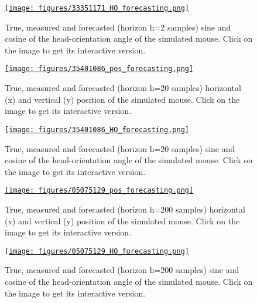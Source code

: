 \documentclass[12pt]{article}
\begin{document}
\begin{figure}
    \centering
    \href{https://www.gatsby.ucl.ac.uk/~rapela/aman/reports/ekfForKinematicsAndHeadOrientation/figures/33351171_HO_forecasting.html}{\texttt{[image: figures/33351171\_HO\_forecasting.png]}}
    \caption{True, measured and forecasted (horizon h=2 samples) sine and
    cosine of the head-orientation angle
    of the simulated mouse. Click on the image to get its
    interactive version.}
    \label{fig:sim_h2_HO}
\end{figure}

\begin{figure}
    \centering
    \href{https://www.gatsby.ucl.ac.uk/~rapela/aman/reports/ekfForKinematicsAndHeadOrientation/figures/35401086_pos_forecasting.html}{\texttt{[image: figures/35401086\_pos\_forecasting.png]}}
    \caption{True, measured and forecasted (horizon h=20 samples) horizontal (x) and vertical (y)
    position of the simulated mouse. Click on the image to get its
    interactive version.}
    \label{fig:sim_h20_pos}
\end{figure}

\begin{figure}
    \centering
    \href{https://www.gatsby.ucl.ac.uk/~rapela/aman/reports/ekfForKinematicsAndHeadOrientation/figures/35401086_HO_forecasting.html}{\texttt{[image: figures/35401086\_HO\_forecasting.png]}}
    \caption{True, measured and forecasted (horizon h=20 samples) sine and
    cosine of the head-orientation angle
    of the simulated mouse. Click on the image to get its
    interactive version.}
    \label{fig:sim_h20_HO}
\end{figure}

\begin{figure}
    \centering
    \href{https://www.gatsby.ucl.ac.uk/~rapela/aman/reports/ekfForKinematicsAndHeadOrientation/figures/05075129_pos_forecasting.html}{\texttt{[image: figures/05075129\_pos\_forecasting.png]}}
    \caption{True, measured and forecasted (horizon h=200 samples) horizontal (x) and vertical (y)
    position of the simulated mouse. Click on the image to get its
    interactive version.}
    \label{fig:sim_h200_pos}
\end{figure}

\begin{figure}
    \centering
    \href{https://www.gatsby.ucl.ac.uk/~rapela/aman/reports/ekfForKinematicsAndHeadOrientation/figures/05075129_HO_forecasting.html}{\texttt{[image: figures/05075129\_HO\_forecasting.png]}}
    \caption{True, measured and forecasted (horizon h=200 samples) sine and
    cosine of the head-orientation angle
    of the simulated mouse. Click on the image to get its
    interactive version.}
    \label{fig:sim_h200_HO}
\end{figure}
\end{document}
